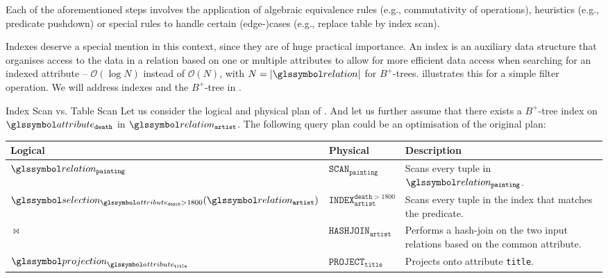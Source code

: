 Each of the aforementioned steps involves the application of algebraic equivalence rules \cite{Garcia:2009Database}  (e.g., commutativity of operations), heuristics \cite{Garcia:2009Database,Graefe:1993Query,Swami:1989Optimization,Bruno:2010Polynomial,Tsialiamanis:2012Heuristics,} (e.g., predicate pushdown) or special rules to handle certain (edge-)cases \cite{Jarke:1984Query,Graefe:1993Query} (e.g., replace table by index scan). 

Indexes deserve a special mention in this context, since they are of huge practical importance. An index is an auxiliary data structure that organises access to the data in a relation based on one or multiple attributes to allow for more efficient data access when searching for an indexed attribute -- $\mathcal{O}(\log N)$ instead of $\mathcal{O}(N)$, with $N = |\relation|$ for $B^{+}$-trees.  illustrates this for a simple filter operation. We will address indexes and the $B^{+}$-tree in .

\begin{example}[label=example:index_scan]{Index Scan vs. Table Scan}{}
    Let us consider the logical and physical plan of . And let us further assume that there exists a $B^{+}$-tree index on $\attribute_{\mathtt{death}}$ in $\relation_{\mathtt{artist}}$. The following query plan could be an optimisation of the original plan:

    \begin{center}
        \begin{tabular}{| l | l | p{6cm} |}
            \hline
            \textbf{Logical} & \textbf{Physical} & \textbf{Description} \\ 
            \hline
            \hline
            $\relation_{\mathtt{painting}}$ & $\mathtt{SCAN}_{\mathtt{painting}}$ & Scans every tuple in $\relation_{\mathtt{painting}}$. \\
            \hline
            $\selection_{\attribute_{\mathtt{death}} > 1800}(\relation_{\mathtt{artist}})$ & $\mathtt{INDEX}^{\mathtt{death} > 1800}_{\mathtt{artist}}$ & Scans every tuple in the index that matches the predicate. \\
            \hline
            $\Join$ & $\mathtt{HASHJOIN}_{\mathtt{artist}}$ & Performs a hash-join on the two input relations based on the common attribute. \\
            \hline
            $\projection_{\attribute_{\mathtt{title}}}$ & $\mathtt{PROJECT}_{\mathtt{title}}$ & Projects onto attribute \texttt{title}. \\
            \hline
        \end{tabular}
    \end{center}
\end{example}


